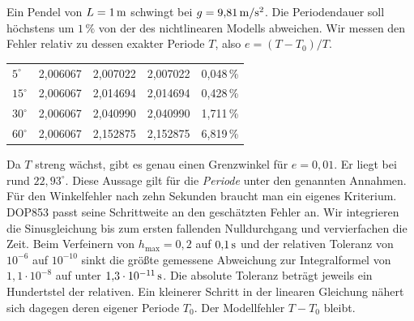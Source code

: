 Ein Pendel von \(L=1\,\mathrm{m}\) schwingt bei \(g=9{,}81\,\mathrm{m/s^2}\). Die Periodendauer soll höchstens um \(1\,\%\) von der des nichtlinearen Modells abweichen. Wir messen den Fehler relativ zu dessen exakter Periode \(T\), also \(e=(T-T_0)/T\).
{\tblstart\begin{tabularx}{\linewidth}{@{}Yrrrr@{}}\toprule
{}&&&&\\\midrule
\(5^\circ\)&2,006067&2,007022&2,007022&0,048\,\%\\
\(15^\circ\)&2,006067&2,014694&2,014694&0,428\,\%\\
\(30^\circ\)&2,006067&2,040990&2,040990&1,711\,\%\\
\(60^\circ\)&2,006067&2,152875&2,152875&6,819\,\%\\\bottomrule\end{tabularx}\par}
Da \(T\) streng wächst, gibt es genau einen Grenzwinkel für \(e=0{,}01\). Er liegt bei rund \(22{,}93^\circ\). Diese Aussage gilt für die \emph{Periode} unter den genannten Annahmen. Für den Winkelfehler nach zehn Sekunden braucht man ein eigenes Kriterium.
DOP853 passt seine Schrittweite an den geschätzten Fehler an. Wir integrieren die Sinusgleichung bis zum ersten fallenden Nulldurchgang und vervierfachen die Zeit. Beim Verfeinern von \(h_{\max}=0{,}2\) auf \(0{,}1\,\mathrm{s}\) und der relativen Toleranz von \(10^{-6}\) auf \(10^{-10}\) sinkt die größte gemessene Abweichung zur Integralformel von \(1{,}1\cdot10^{-8}\) auf unter \(1{,}3\cdot10^{-11}\,\mathrm{s}\). Die absolute Toleranz beträgt jeweils ein Hundertstel der relativen. Ein kleinerer Schritt in der linearen Gleichung nähert sich dagegen deren eigener Periode \(T_0\). Der Modellfehler \(T-T_0\) bleibt.

